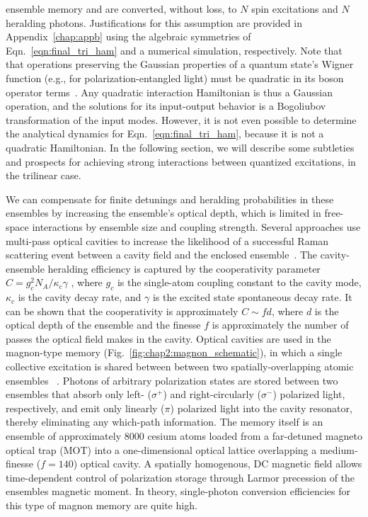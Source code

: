 \documentclass[aps,twocolumn,secnumarabic,amsmath,amssymb,pra,groupedaddress,
showpacs, showkeys]{revtex4-1}
\begin{document}
ensemble memory and are converted, without loss, to $N$ spin excitations and
$N$ heralding photons. Justifications for this assumption are provided in
Appendix~\ref{chap:appb} using the algebraic symmetries of
Eqn.~\ref{eqn:final_tri_ham} and a numerical simulation, respectively. Note
that that operations preserving the Gaussian properties of a quantum state's
Wigner function (e.g., for polarization-entangled light) must be quadratic in
its boson operator terms~\cite{RevModPhys.77.513}. Any quadratic interaction
Hamiltonian is thus a Gaussian operation, and the solutions for its
input-output behavior is a Bogoliubov transformation of the input
modes. However, it is not even possible to determine the analytical dynamics
for Eqn.~\ref{eqn:final_tri_ham}, because it is not a quadratic Hamiltonian. In
the following section, we will describe some subtleties and prospects for
achieving strong interactions between quantized excitations, in the trilinear
case. 

We can compensate for finite detunings and heralding probabilities in these
ensembles by increasing the ensemble's optical depth, which is limited in
free-space interactions by ensemble size and coupling strength. Several
approaches use multi-pass optical cavities to increase the likelihood of a
successful Raman scattering event between a cavity field and the enclosed
ensemble~\cite{PhysRevLett.92.123601, PhysRevLett.95.133601,
  PhysRevLett.98.190503,Thompson07072006,PhysRevLett.98.183601}. The
cavity-ensemble heralding efficiency is captured by the cooperativity parameter
$C=g_c^2 N_A/\kappa_c \gamma$ , where $g_c$ is the single-atom coupling
constant to the cavity mode, $\kappa_c$ is the cavity decay rate, and $\gamma$
is the excited state spontaneous decay rate. It can be shown that the
cooperativity is approximately $C\sim fd$, where $d$ is the optical depth of
the ensemble and the finesse ${f}$ is approximately the number of passes the
optical field makes in the cavity. Optical cavities are used in the magnon-type
memory (Fig.~\ref{fig:chap2:magnon_schematic}), in which a single collective
excitation is shared between between two spatially-overlapping atomic ensembles
~\cite{PhysRevLett.103.043601}. Photons of arbitrary polarization states are
stored between two ensembles that absorb only left- ($\sigma^{+}$) and
right-circularly ($\sigma^{-}$) polarized light, respectively, and emit only
linearly ($\pi$) polarized light into the cavity resonator, thereby eliminating
any which-path information. The memory itself is an ensemble of approximately
8000 cesium atoms loaded from a far-detuned magneto optical trap (MOT) into a
one-dimensional optical lattice overlapping a medium-finesse ($f=140$) optical
cavity. A spatially homogenous, DC magnetic field allows time-dependent control
of polarization storage through Larmor precession of the ensembles magnetic
moment. In theory, single-photon conversion efficiencies for this type of
magnon memory are quite high.
\end{document}
